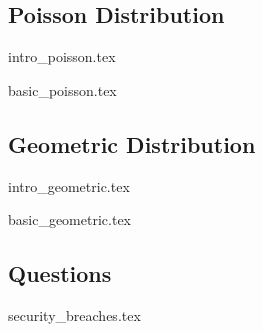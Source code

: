 \documentclass{exam}
\begin{document}
\subsection{Poisson Distribution}
{intro_poisson.tex}
\begin{questions}
{basic_poisson.tex}
\end{questions}
\subsection{Geometric Distribution}
{intro_geometric.tex}
\begin{questions}
{basic_geometric.tex}
\end{questions}
\subsection{Questions}
\begin{questions}
{security_breaches.tex}
\end{questions}
\end{document}
